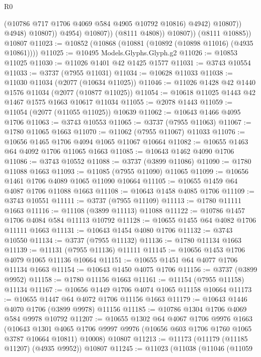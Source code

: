 \begin{lexlean}{R0}
\begin{coremodule}
                              (@10786 @717 @1706 @4069 @584 @4905 @10792 @10816)
                              @4942)
                            @10807))
                        @4948)
                      @10807))
                  @4954)
                @10807))
            (@8111 @4808))
          @10807))
      (@8111 @10885))
    @10807
@11023 := @10852 (@10868 (@10881 (@10892 (@10898 @11016) (@4935 @10861))))
@11025 := @10495 Models.Glyphs.Glyph.g2
@11026 := @10853 @11025
@11030 := @11026 @1401 @42 @1425 @1577
@11031 := @3743 @10554
@11033 := @3737 (@7955 @11031)
@11034 := @10628 @11033
@11038 := @11030 @11034 (@2077 (@10634 @11025))
@11046 := @11026 @1428 @42 @1440 @1576 @11034 (@2077 (@10877 @11025))
@11054 := @10618 @11025 @1443 @42 @1467 @1575 @1663 @10617 @11034
@11055 := @2078 @1443
@11059 := @11054 (@2077 (@11055 @11025)) @10639
@11062 := @10643 @1466 @4095 @1706
@11063 := @3743 @10553
@11065 := @3737 (@7955 @11063)
@11067 := @1780 @11065 @1663
@11070 := @11062 (@7955 @11067) @11033
@11076 := @10656 @1465 @1706 @4094 @1065 @11067 @10664
@11082 := @10655 @1463 @64 @4092 @1706 @11065 @1663
@11085 := @10643 @1462 @4090 @1706
@11086 := @3743 @10552
@11088 := @3737 (@3899 @11086)
@11090 := @1780 @11088 @1663
@11093 := @11085 (@7955 @11090) @11065
@11099 := @10656 @1461 @1706 @4089 @1065 @11090 @10664
@11105 := @10655 @1459 @64 @4087 @1706 @11088 @1663
@11108 := @10643 @1458 @4085 @1706
@11109 := @3743 @10551
@11111 := @3737 (@7955 @11109)
@11113 := @1780 @11111 @1663
@11116 := @11108 (@3899 @11113) @11088
@11122 := @10786 @1457 @1706 @4084 @584 @11113 @10792
@11128 := @10655 @1455 @64 @4082 @1706 @11111 @1663
@11131 := @10643 @1454 @4080 @1706
@11132 := @3743 @10550
@11134 := @3737 (@7955 @11132)
@11136 := @1780 @11134 @1663
@11139 := @11131 (@7955 @11136) @11111
@11145 := @10656 @1453 @1706 @4079 @1065 @11136 @10664
@11151 := @10655 @1451 @64 @4077 @1706 @11134 @1663
@11154 := @10643 @1450 @4075 @1706
@11156 := @3737 (@3899 @9952)
@11158 := @1780 @11156 @1663
@11161 := @11154 (@7955 @11158) @11134
@11167 := @10656 @1449 @1706 @4074 @1065 @11158 @10664
@11173 := @10655 @1447 @64 @4072 @1706 @11156 @1663
@11179 := @10643 @1446 @4070 @1706 (@3899 @9978) @11156
@11185 := @10786 @1304 @1706 @4069 @584 @9978 @10792
@11207 := @10655
    @1302
    @64
    @4067
    @1706
    @9976
    @1663
    (@10643
      @1301
      @4065
      @1706
      @9997
      @9976
      (@10656 @603 @1706 @1760 @1065 @3787 @10664 @10811)
      @10008)
    @10807
@11213 := @11173 (@11179 (@11185 @11207) (@4935 @9952)) @10807
@11245 := @11023
    (@11038
      (@11046
        (@11059

\end{coremodule}
\end{lexlean}
